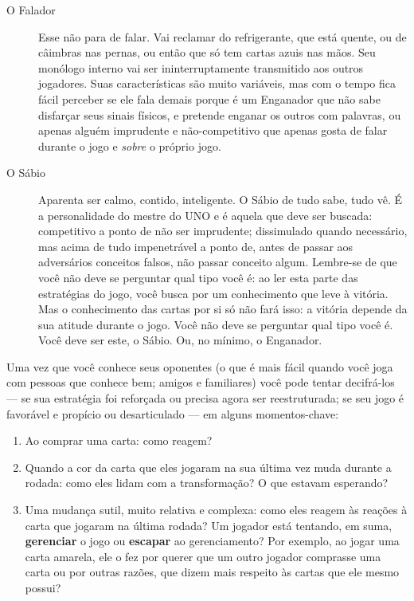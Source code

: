 \begin{description}
\item[O Falador]{Esse não para de falar. Vai reclamar do refrigerante, que está quente, ou de câimbras nas pernas, ou então que só tem cartas azuis nas mãos. Seu monólogo interno vai ser ininterruptamente transmitido aos outros jogadores. Suas características são muito variáveis, mas com o tempo fica fácil perceber se ele fala demais porque é um Enganador que não sabe disfarçar seus sinais físicos, e pretende enganar os outros com palavras, ou apenas alguém imprudente e não-competitivo que apenas gosta de falar durante o jogo e \textit{sobre} o próprio jogo.}
\item[O Sábio]{Aparenta ser calmo, contido, inteligente. O Sábio de tudo sabe, tudo vê. É a personalidade do mestre do UNO  e é aquela que deve ser buscada: competitivo a ponto de não ser imprudente; dissimulado quando necessário, mas acima de tudo impenetrável a ponto de, antes de passar aos adversários conceitos falsos, não passar conceito algum. Lembre-se de que você não deve se perguntar qual tipo você é: ao ler esta parte das estratégias do jogo, você busca por um conhecimento que leve à vitória. Mas o conhecimento das cartas por si só não fará isso: a vitória depende da sua atitude durante o jogo. Você não deve se perguntar qual tipo você é. Você deve ser este, o Sábio. Ou, no mínimo, o Enganador.}
\end{description}

Uma vez que você conhece seus oponentes (o que é mais fácil quando você joga com pessoas que conhece bem; amigos e familiares) você pode tentar decifrá-los --- se sua estratégia foi reforçada ou precisa agora ser reestruturada; se seu jogo é favorável e propício ou desarticulado --- em alguns momentos-chave:

\begin{enumerate}
\item{Ao comprar uma carta: como reagem?}
\item{Quando a cor da carta que eles jogaram na sua última vez muda durante a rodada: como eles lidam com a transformação? O que estavam esperando?}
\item{Uma mudança sutil, muito relativa e complexa: como eles reagem às reações à carta que jogaram na última rodada? Um jogador está tentando, em suma, \textbf{gerenciar} o jogo ou \textbf{escapar} ao gerenciamento? Por exemplo, ao jogar uma carta amarela, ele o fez por querer que um outro jogador comprasse uma carta ou por outras razões, que dizem mais respeito às cartas que ele mesmo possui?}
\end{enumerate}

